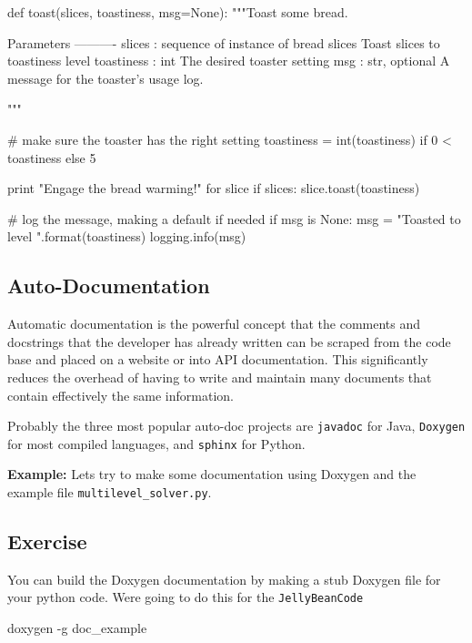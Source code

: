 \begin{DoxyVerb}def toast(slices, toastiness, msg=None):
    """Toast some bread.

    Parameters
    ----------
    slices : sequence of instance of bread slices
        Toast slices to toastiness level
    toastiness : int
        The desired toaster setting
    msg : str, optional
        A message for the toaster's usage log.

    """

    # make sure the toaster has the right setting
    toastiness = int(toastiness) if 0 < toastiness else 5

    print "Engage the bread warming!"
    for slice if slices:
        slice.toast(toastiness)

    # log the message, making a default if needed
    if msg is None:
        msg = "Toasted to level {}".format(toastiness)
    logging.info(msg)
\end{DoxyVerb}


\subsection*{Auto-\/\+Documentation}

Automatic documentation is the powerful concept that the comments and docstrings that the developer has already written can be scraped from the code base and placed on a website or into A\+PI documentation. This significantly reduces the overhead of having to write and maintain many documents that contain effectively the same information.

Probably the three most popular auto-\/doc projects are {\tt javadoc} for Java, {\tt Doxygen} for most compiled languages, and {\tt sphinx} for Python.

{\bfseries Example\+:} Let\textquotesingle{}s try to make some documentation using Doxygen and the example file {\tt {\ttfamily multilevel\+\_\+solver.\+py}}.

\subsection*{Exercise}

You can build the Doxygen documentation by making a stub Doxygen file for your python code. We\textquotesingle{}re going to do this for the {\tt {\ttfamily Jelly\+Bean\+Code}} \begin{DoxyVerb} doxygen -g doc_example
\end{DoxyVerb}


